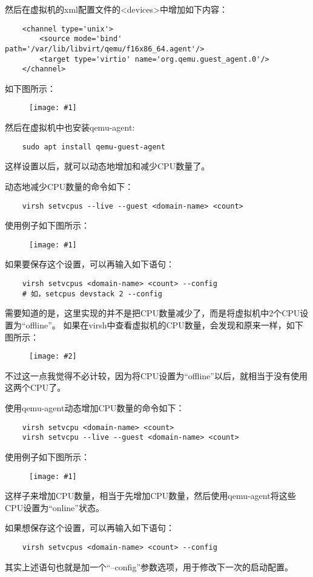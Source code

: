 \documentclass[a4paper,left=2.5cm,right=2.5cm,11pt]{article}
\newcommand{\fic}[1]{\begin{figure}[H]
		\center
		\texttt{[image: \#1]}
	\end{figure}}
\newcommand{\sizedfic}[2]{\begin{figure}[H]
		\center
		\texttt{[image: \#2]}
	\end{figure}}
\begin{document}
	然后在虚拟机的xml配置文件的<devices>中增加如下内容：
	\begin{lstlisting}
	<channel type='unix'>
		<source mode='bind' path='/var/lib/libvirt/qemu/f16x86_64.agent'/>
   		<target type='virtio' name='org.qemu.guest_agent.0'/>
	</channel>
	\end{lstlisting}

	如下图所示：
	\fic{15.png}

	然后在虚拟机中也安装qemu-agent:
	\begin{lstlisting}
	sudo apt install qemu-guest-agent
	\end{lstlisting}

	这样设置以后，就可以动态地增加和减少CPU数量了。\par

	动态地减少CPU数量的命令如下：
	\begin{lstlisting}
	virsh setvcpus --live --guest <domain-name> <count>
	\end{lstlisting}

	使用例子如下图所示：
	\fic{13.png}

	如果要保存这个设置，可以再输入如下语句：
	\begin{lstlisting}
	virsh setvcpus <domain-name> <count> --config
	# 如，setcpus devstack 2 --config
	\end{lstlisting}

	需要知道的是，这里实现的并不是把CPU数量减少了，而是将虚拟机中2个CPU设置为“offline”。
	如果在virsh中查看虚拟机的CPU数量，会发现和原来一样，如下图所示：
	\sizedfic{0.6}{14.png}

	不过这一点我觉得不必计较，因为将CPU设置为“offline”以后，就相当于没有使用这两个CPU了。\par

	使用qemu-agent动态增加CPU数量的命令如下：
	\begin{lstlisting}
	virsh setvcpu <domain-name> <count>
	virsh setvcpu --live --guest <domain-name> <count>
	\end{lstlisting}

	使用例子如下图所示：
	\fic{16.png}

	这样子来增加CPU数量，相当于先增加CPU数量，然后使用qemu-agent将这些CPU设置为“online”状态。\par

	如果想保存这个设置，可以再输入如下语句：
	\begin{lstlisting}
	virsh setvcpus <domain-name> <count> --config
	\end{lstlisting}

	其实上述语句也就是加一个“--config”参数选项，用于修改下一次的启动配置。
\end{document}
